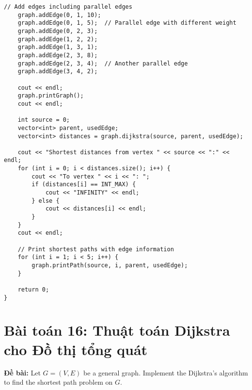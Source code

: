 \documentclass[12pt,a4paper]{article}
\begin{document}
\begin{lstlisting}[caption={Thuật toán Dijkstra cho đa đồ thị}]
    // Add edges including parallel edges
    graph.addEdge(0, 1, 10);
    graph.addEdge(0, 1, 5);  // Parallel edge with different weight
    graph.addEdge(0, 2, 3);
    graph.addEdge(1, 2, 2);
    graph.addEdge(1, 3, 1);
    graph.addEdge(2, 3, 8);
    graph.addEdge(2, 3, 4);  // Another parallel edge
    graph.addEdge(3, 4, 2);
    
    cout << endl;
    graph.printGraph();
    cout << endl;
    
    int source = 0;
    vector<int> parent, usedEdge;
    vector<int> distances = graph.dijkstra(source, parent, usedEdge);
    
    cout << "Shortest distances from vertex " << source << ":" << endl;
    for (int i = 0; i < distances.size(); i++) {
        cout << "To vertex " << i << ": ";
        if (distances[i] == INT_MAX) {
            cout << "INFINITY" << endl;
        } else {
            cout << distances[i] << endl;
        }
    }
    cout << endl;
    
    // Print shortest paths with edge information
    for (int i = 1; i < 5; i++) {
        graph.printPath(source, i, parent, usedEdge);
    }
    
    return 0;
}
\end{lstlisting}

\section{Bài toán 16: Thuật toán Dijkstra cho Đồ thị tổng quát}

\textbf{Đề bài:} Let $G = (V, E)$ be a general graph. Implement the Dijkstra's algorithm to find the shortest path problem on $G$.
\end{document}
